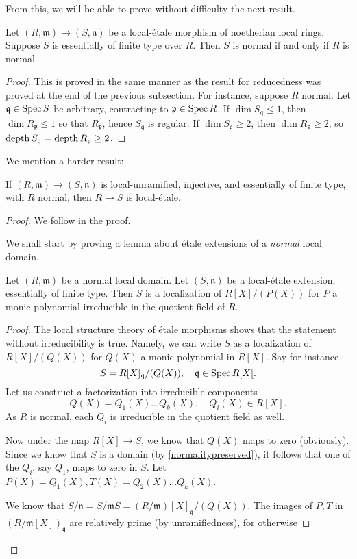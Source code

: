 From this, we will be able to prove without difficulty the next result.
\begin{proposition} \label{normalitypreserved}
Let $(R, \mathfrak{m}) \to (S, \mathfrak{n})$ be a local-\'etale morphism of noetherian local
rings. 
Suppose $S$ is essentially of finite type over $R$.
Then $S$ is normal if and only if $R$ is normal.
\end{proposition} 
\begin{proof} 
This is proved in the same manner as the result for reducedness was proved at
the end of the previous subsection.
For instance, suppose $R$ normal. Let $\mathfrak{q} \in \operatorname{Spec} S$ be arbitrary,
contracting to $\mathfrak{p} \in \operatorname{Spec} R$. If $\dim S_{\mathfrak{q}} \leq 1$,
then $\dim R_{\mathfrak{p}} \leq 1$ so that $R_{\mathfrak{p}}$, hence
$S_{\mathfrak{q}}$ is regular. If $\dim S_{\mathfrak{q}} \geq 2$, then $\dim
R_{\mathfrak{p}} \geq 2$, so 
$\operatorname{depth} S_{\mathfrak{q}} = \operatorname{depth} R_{\mathfrak{p}} \geq 2$.
\end{proof} 

We mention a harder result:

\begin{theorem} 
If $(R, \mathfrak{m}) \to (S, \mathfrak{n})$ is local-unramified, injective,
and essentially of finite type, with $R$ normal, then $R \to S$ is
local-\'etale.
\end{theorem} 
\begin{proof} 
We follow \cite{Mi67} in the proof.

We shall start by proving a lemma about \'etale extensions of a \emph{normal}
local domain.
\begin{lemma} 
Let $(R, \mathfrak{m})$ be a normal local domain. Let $(S, \mathfrak{n})$ be a
local-\'etale extension, essentially of finite type.
Then $S$ is a localization of $R[X]/(P(X))$ for $P$ a monic polynomial
irreducible in the quotient field of $R$.
\end{lemma} 
\begin{proof} 
The local structure theory of \'etale morphisms shows that the statement
without irreducibility is true.
Namely, we can write 
$S$ as a localization of $R[X]/(Q(X))$ for $Q(X)$ a monic polynomial in $R[X]$. 
Say for instance 
\[ S = R[X]_{\mathfrak{q}}/(Q(X)), \quad \mathfrak{q} \in \operatorname{Spec} R[X[.  \]
Let us construct a factorization into irreducible components
\[ Q(X) = Q_1(X) \dots Q_k(X) , \quad Q_i(X) \in R[X]. \]
As $R$ is normal, each $Q_i$ is irreducible in the quotient field as well.

Now under the map $R[X] \to S$, we know that $Q(X)$ maps to zero (obviously). Since we know that $S$ is a domain (by
\cref{normalitypreserved}), it follows that one of the $Q_i$, say $Q_1$, maps
to zero in $S$.
Let $P(X) = Q_1(X), T(X) = Q_2(X) \dots Q_k(X)$.

We know that $S/\mathfrak{n} = S/\mathfrak{m}S  =
(R/\mathfrak{m})[X]_{\mathfrak{q}}/(Q(X))$.
The images of $P, T$ in $(R/\mathfrak{m}[X])_{\mathfrak{q}}$ are relatively
prime (by unramifiedness), for otherwise 
\end{proof} 

\end{proof} 

